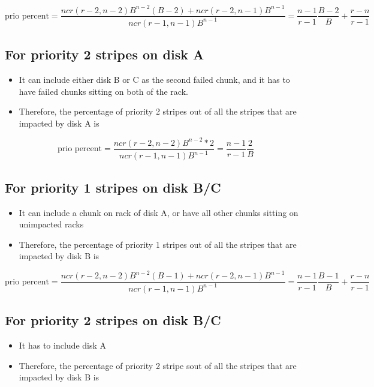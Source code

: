 \documentclass[journal]{IEEEtran}
\begin{document}
\begin{equation*}
  \text{prio percent}=\frac{ncr(r-2,n-2)B^{n-2}(B-2)+ncr(r-2,n-1)B^{n-1}}{ncr(r-1,n-1)B^{n-1}}=\frac{n-1}{r-1}\frac{B-2}{B}+\frac{r-n}{r-1}
\end{equation*}

\subsection*{For priority 2 stripes on disk A}
\begin{itemize}
  \item It can include either disk B or C as the second failed chunk, and it has to have failed chunks sitting on both of the rack.
  \item Therefore, the percentage of priority 2 stripes out of all the stripes that are impacted by disk A is
\end{itemize}

\begin{equation*}
  \text{prio percent}=\frac{ncr(r-2,n-2)B^{n-2}*2}{ncr(r-1,n-1)B^{n-1}}=\frac{n-1}{r-1}\frac{2}{B}
\end{equation*}

\subsection*{For priority 1 stripes on disk B/C}
\begin{itemize}
  \item It can include a chunk on rack of disk A, or have all other chunks sitting on unimpacted racks
  \item Therefore, the percentage of priority 1 stripes out of all the stripes that are impacted by disk B is
\end{itemize}

\begin{equation*}
  \text{prio percent}=\frac{ncr(r-2,n-2)B^{n-2}(B-1)+ncr(r-2,n-1)B^{n-1}}{ncr(r-1,n-1)B^{n-1}}=\frac{n-1}{r-1}\frac{B-1}{B}+\frac{r-n}{r-1}
\end{equation*}

\subsection*{For priority 2 stripes on disk B/C}
\begin{itemize}
  \item It has to include disk A
  \item Therefore, the percentage of priority 2 stripe sout of all the stripes that are impacted by disk B is
\end{itemize}
\end{document}
